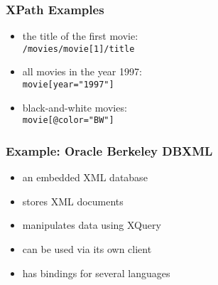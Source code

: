 \documentclass[dvipsnames]{beamer}
\theoremstyle{plain}
\begin{document}
\begin{frame}
  \frametitle{XPath Examples}

  \begin{example}
    \begin{itemize}
      \item the title of the first movie:\\
        \lstinline!/movies/movie[1]/title!

      \pause
      \item all movies in the year 1997:\\
        \lstinline!movie[year="1997"]!

      \pause
      \item black-and-white movies:\\
        \lstinline!movie[@color="BW"]!
    \end{itemize}
  \end{example}
\end{frame}

\begin{frame}
  \frametitle{Example: Oracle Berkeley DBXML}

  \begin{itemize}
    \item an embedded XML database
    \item stores XML documents
    \item manipulates data using XQuery
    \item can be used via its own client
    \item has bindings for several languages
  \end{itemize}
\end{frame}
\end{document}
